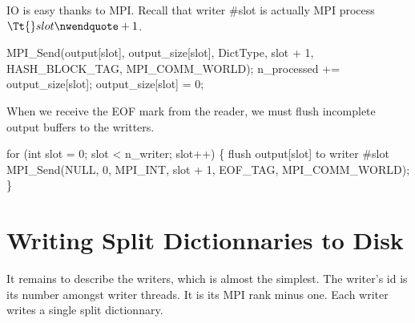 \documentclass{article}%
\newcommand{\MPI}{\textsf{MPI}\xspace}
\begin{document}
\nwendcode{}IO is easy thanks to \MPI. Recall that writer \#{\Tt{}slot\nwendquote} is actually \MPI
process ${\Tt{}slot\nwendquote} + 1$.
                
\nwenddocs{}\endmoddef\nwstartdeflinemarkup{}\nwenddeflinemarkup
MPI_Send(output[slot], output_size[slot], DictType, slot + 1, HASH_BLOCK_TAG, MPI_COMM_WORLD);
n_processed += output_size[slot];
output_size[slot] = 0;


\nwendcode{}When we receive the {\Tt{}EOF\nwendquote} mark from the reader, we must flush incomplete
output buffers to the writters.

\nwenddocs{}\endmoddef\nwstartdeflinemarkup{}\nwenddeflinemarkup
for (int slot = 0; slot < n_writer; slot++) \{
        \LA{}flush \code{}output[slot]\edoc{} to writer \#\code{}slot\edoc{}~{\nwtagstyle{}}\RA{}
        MPI_Send(NULL, 0, MPI_INT, slot + 1, EOF_TAG, MPI_COMM_WORLD);
\}

\nwendcode{}\nwdocspar






\section{Writing Split Dictionnaries to Disk}

It remains to describe the writers, which is almost the simplest. The writer's
{\Tt{}id\nwendquote} is its number amongst writer threads. It is its \MPI rank minus one.
Each writer writes a single split dictionnary.
\end{document}
